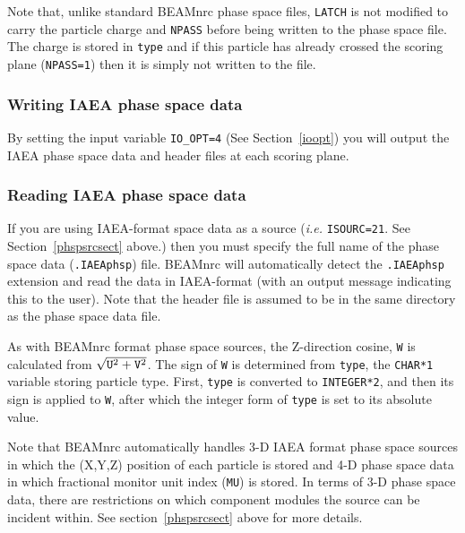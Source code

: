 \documentclass[12pt,twoside]{article}
\begin{document}
Note that, unlike standard BEAMnrc phase space files, {\tt LATCH} is not modified to
carry the particle charge and {\tt NPASS} before being written to the phase space file.
The charge is stored in {\tt type} and if this particle has already crossed the
scoring plane ({\tt NPASS=1}) then it is simply not written to the file.

\subsubsection{Writing IAEA phase space data}

By setting the input variable {\tt IO\_OPT=4} (See Section~\ref{ioopt}) you will
output the IAEA phase space data and header files at each scoring plane.

\subsubsection{Reading IAEA phase space data}

If you are using IAEA-format space data as a source ({\em i.e.} {\tt ISOURC=21}.
See Section~\ref{phspsrcsect} above.) then you must specify the full name of the
phase space data ({\tt .IAEAphsp}) file.  BEAMnrc will automatically detect the
{\tt .IAEAphsp} extension and read the data in IAEA-format (with an output message
indicating this to the user).  Note that the header file is assumed to be in the
same directory as the phase space data file.

As with BEAMnrc format phase space sources, the Z-direction cosine, {\tt W} is
calculated from $\sqrt{{\tt U}^2+{\tt V}^2}$.  The sign of {\tt W} is determined
from {\tt type}, the {\tt CHAR*1} variable storing particle type.  First, {\tt type}
is converted to {\tt INTEGER*2}, and then its sign is applied to {\tt W}, after which
the integer form of {\tt type} is set to its absolute value.

Note that BEAMnrc automatically handles 3-D IAEA format phase space sources in which the (X,Y,Z) position
of each particle is stored and 4-D phase space data in which fractional monitor unit index ({\tt MU}) is stored.
In terms of 3-D phase space data, there are restrictions on which component modules the source can
be incident within.  See section~\ref{phspsrcsect} above for more details.
\end{document}
